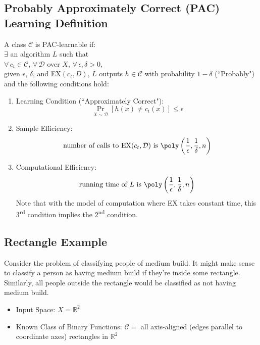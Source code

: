 \documentclass{article}
\begin{document}
\subsection{Probably Approximately Correct (PAC) Learning Definition}

A class $\mathcal{C}$ is PAC-learnable if: \\
$\exists$ an algorithm $L$ such that \\
$\forall \, c_t \in \mathcal{C}$, $\forall \, \mathcal{D}$ over $X$, $\forall \, \epsilon, \delta > 0$, \\
given $\epsilon$, $\delta$, and EX$(c_t, D)$, $L$ outputs $h \in \mathcal{C}$ with probability $1 - \delta$ (``Probably") and the following conditions hold:

\begin{enumerate}

    \item Learning Condition (``Approximately Correct"):
    \[\Pr_{X \sim \mathcal{D}}[h(x) \neq c_t(x)] \leq \epsilon\]

    \item Sample Efficiency:
    \[\text{number of calls to EX} (c_t, \mathcal{D}) \text{ is } \poly\left(\frac{1}{\epsilon}, \frac{1}{\delta}, n\right)\]

    \item Computational Efficiency:
    \[\text{running time of } L \text{ is } \poly\left(\frac{1}{\epsilon}, \frac{1}{\delta}, n\right)\]
    Note that with the model of computation where EX takes constant time, this $3$\textsuperscript{rd} condition implies the $2$\textsuperscript{nd} condition.

\end{enumerate}

\subsection{Rectangle Example}

Consider the problem of classifying people of medium build. It might make sense to classify a person as having medium build if they're inside some rectangle. Similarly, all people outside the rectangle would be classified as not having medium build.

\begin{itemize}

    \item
    Input Space: $X = \mathbb{R}^2$

    \item
    Known Class of Binary Functions: $\mathcal{C} =$ all axis-aligned (edges parallel to coordinate axes) rectangles in $\mathbb{R}^2$

\end{itemize}
\end{document}
